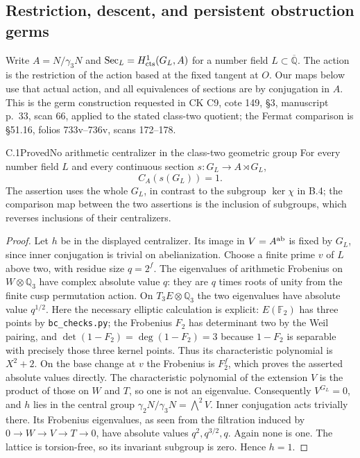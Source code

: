 \subsection{Restriction, descent, and persistent obstruction germs}

Write $A=N/\gamma_3N$ and
$\operatorname{Sec}_L=H^1_{\rm cts}(G_L,A)$ for a number field
$L\subset\overline{\mathbb Q}$.  The action is the restriction of
the action based at the fixed tangent at $O$.
Our maps below use that actual action, and all equivalences of
sections are by conjugation in $A$.
This is the germ construction requested in CK C9, cote 149,
\S3, manuscript p.~33, scan 66, applied to the stated class-two
quotient; the Fermat comparison is \S51.16, folios
733v--736v, scans 172--178.

\begin{statement}{C.1}{Proved}{No arithmetic centralizer in the class-two geometric group}
For every number field $L$ and every continuous section
$s:G_L\to A\rtimes G_L$,
\[
                 C_A(s(G_L))=1.                         \tag{C.1}
\]
The assertion uses the whole $G_L$, in contrast to the subgroup
$\ker\chi$ in B.4; the comparison map between the two assertions
is the inclusion of subgroups, which reverses inclusions of their
centralizers.
\end{statement}
\begin{proof}
Let $h$ be in the displayed centralizer.  Its image in
$V=A^{\rm ab}$ is fixed by $G_L$, since inner conjugation is
trivial on abelianization.  Choose a finite prime $v$ of $L$
above two, with residue size $q=2^f$.  The eigenvalues of
arithmetic Frobenius on $W\otimes\mathbb Q_3$ have complex
absolute value $q$: they are $q$ times roots of unity from the
finite cusp permutation action.  On $T_3E\otimes\mathbb Q_3$
the two eigenvalues have absolute value $q^{1/2}$.
Here the necessary elliptic calculation is explicit:
$E(\mathbb F_2)$ has three points by
\texttt{bc\_checks.py}; the Frobenius $F_2$ has determinant
two by the Weil pairing, and
$\det(1-F_2)=\deg(1-F_2)=3$ because $1-F_2$ is separable
with precisely those three kernel points.
Thus its characteristic polynomial is $X^2+2$.
On the base change at $v$ the Frobenius is $F_2^f$,
which proves the asserted absolute values directly.
The characteristic polynomial of the extension $V$ is the
product of those on $W$ and $T$, so one is not an eigenvalue.
Consequently $V^{G_L}=0$, and $h$ lies in the central group
$\gamma_2N/\gamma_3N=\bigwedge^2V$.
Inner conjugation acts trivially there.  Its Frobenius
eigenvalues, as seen from the filtration induced by
$0\to W\to V\to T\to0$, have absolute values
$q^2,q^{3/2},q$.  Again none is one.  The lattice is
torsion-free, so its invariant subgroup is zero.  Hence $h=1$.
\end{proof}

